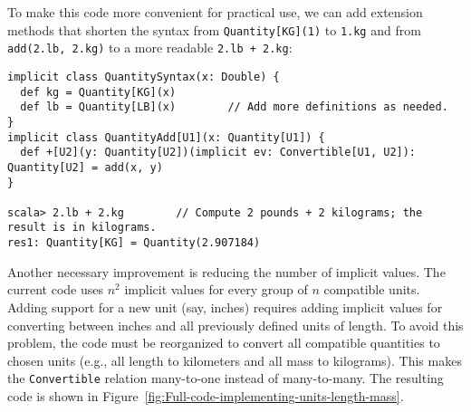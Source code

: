 To make this code more convenient for practical use, we can add extension
methods that shorten the syntax from \lstinline!Quantity[KG](1)!
to \lstinline!1.kg! and from \lstinline!add(2.lb, 2.kg)! to a more
readable \lstinline!2.lb + 2.kg!:
\begin{lstlisting}
implicit class QuantitySyntax(x: Double) {
  def kg = Quantity[KG](x)
  def lb = Quantity[LB](x)        // Add more definitions as needed.
}
implicit class QuantityAdd[U1](x: Quantity[U1]) {
  def +[U2](y: Quantity[U2])(implicit ev: Convertible[U1, U2]): Quantity[U2] = add(x, y)
}

scala> 2.lb + 2.kg        // Compute 2 pounds + 2 kilograms; the result is in kilograms.
res1: Quantity[KG] = Quantity(2.907184)
\end{lstlisting}

Another necessary improvement is reducing the number of implicit values.
The current code uses $n^{2}$ implicit values for every group of
$n$ compatible units. Adding support for a new unit (say, inches)
requires adding implicit values for converting between inches and
all previously defined units of length. To avoid this problem, the
code must be reorganized to convert all compatible quantities to chosen
units (e.g., all length to kilometers and all mass to kilograms).
This makes the \lstinline!Convertible! relation many-to-one
instead of many-to-many. The resulting code is shown in Figure~\ref{fig:Full-code-implementing-units-length-mass}.

